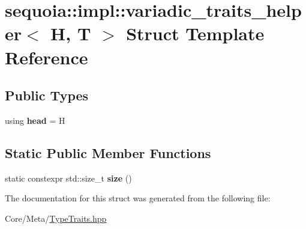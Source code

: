 \hypertarget{structsequoia_1_1impl_1_1variadic__traits__helper}{}\section{sequoia\+::impl\+::variadic\+\_\+traits\+\_\+helper$<$ H, T $>$ Struct Template Reference}
\label{structsequoia_1_1impl_1_1variadic__traits__helper}
\subsection*{Public Types}
\begin{DoxyCompactItemize}
\item 
\mbox{\label{structsequoia_1_1impl_1_1variadic__traits__helper_a907bfd2bd6d6dd58d234615bce3b877d}} 
using {\bfseries head} = H
\end{DoxyCompactItemize}
\subsection*{Static Public Member Functions}
\begin{DoxyCompactItemize}
\item 
\mbox{\label{structsequoia_1_1impl_1_1variadic__traits__helper_ad8a48b141c0a33aa1762ca632addeb46}} 
static constexpr std\+::size\+\_\+t {\bfseries size} ()
\end{DoxyCompactItemize}


The documentation for this struct was generated from the following file\+:\begin{DoxyCompactItemize}
\item 
Core/\+Meta/\mbox{\hyperlink{_type_traits_8hpp}{Type\+Traits.\+hpp}}\end{DoxyCompactItemize}
